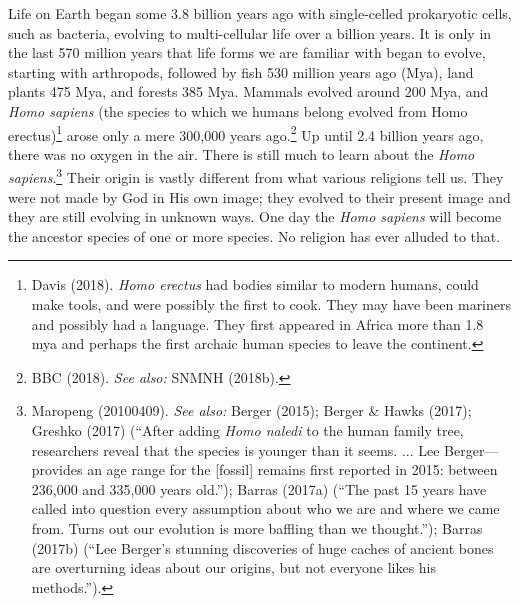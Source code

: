 \begin{multicols}{2}
Life on Earth began some 3.8 billion years ago with single-celled prokaryotic cells, such as bacteria,
evolving to multi-cellular life over a billion years. It is only in the last 570 million years that life forms
we are familiar with began to evolve, starting with arthropods, followed by fish 530 million years ago
(Mya), land plants 475 Mya, and forests 385 Mya. Mammals evolved around 200 Mya, and \textit{Homo
sapiens} (the species to which we humans belong evolved from Homo erectus)\footnote{Davis (2018). \textit{Homo erectus} had bodies similar to modern humans, could make tools, and were possibly the first to cook. They may have been mariners and possibly had a language. They first appeared in Africa more than 1.8 mya and perhaps the first archaic human species to leave the continent.} arose only a mere 300,000 years ago.\footnote{BBC (2018). \textit{See also:} SNMNH (2018b).} Up until 2.4 billion years ago, there was no oxygen in the air. There is still much to learn about the \textit{Homo sapiens}.\footnote{Maropeng (20100409). \textit{See also:} Berger (2015); Berger \& Hawks (2017); Greshko (2017) (“After adding \textit{Homo naledi} to the human family tree, researchers reveal that the species is younger than it seems. ... Lee Berger—provides an age range for the [fossil] remains first reported in 2015: between 236,000 and 335,000 years old.”); Barras (2017a) (“The past 15 years have called into question every assumption about who we are and where we came from. Turns out our evolution is more baffling than we thought.”); Barras (2017b) (“Lee Berger’s stunning discoveries of huge caches of ancient bones are overturning ideas about our origins, but not everyone likes his methods.”).} Their origin is vastly different from what various religions tell us. They were not made by God in His own image; they evolved to their present image and they are still evolving in unknown ways. One day the \textit{Homo sapiens} will become the ancestor species of one or more species. No religion has ever alluded to that.


\end{multicols}
